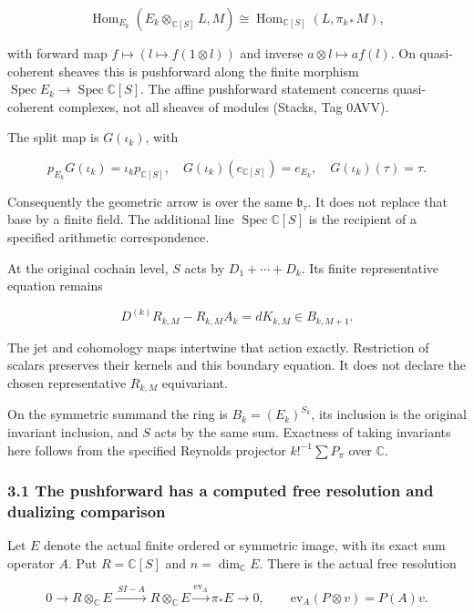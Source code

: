 \[\operatorname{Hom}_{E_k}(E_k\otimes_{\mathbb C[S]}L,M)
\cong\operatorname{Hom}_{\mathbb C[S]}(L,\pi_{k*}M),\tag{3.2}\]

with forward map \(f\mapsto(l\mapsto f(1\otimes l))\) and inverse
\(a\otimes l\mapsto a f(l)\). On quasi-coherent sheaves this is
pushforward along the finite morphism
\(\operatorname{Spec}E_k\to\operatorname{Spec}\mathbb C[S]\). The affine
pushforward statement concerns quasi-coherent complexes, not all sheaves
of modules (Stacks, Tag 0AVV).

The split map is \(G(\iota_k)\), with

\[p_{E_k}G(\iota_k)=\iota_kp_{\mathbb C[S]},\quad
G(\iota_k)(e_{\mathbb C[S]})=e_{E_k},\quad G(\iota_k)(\tau)=\tau.\tag{3.3}\]

Consequently the geometric arrow is over the same \(\mathfrak b_\tau\).
It does not replace that base by a finite field. The additional line
\(\operatorname{Spec}\mathbb C[S]\) is the recipient of a specified
arithmetic correspondence.

At the original cochain level, \(S\) acts by \(D_1+\cdots+D_k\). Its
finite representative equation remains

\[D^{(k)}R_{k,M}-R_{k,M}A_k=dK_{k,M}\in B_{k,M+1}.\tag{3.4}\]

The jet and cohomology maps intertwine that action exactly. Restriction
of scalars preserves their kernels and this boundary equation. It does
not declare the chosen representative \(R_{k,M}\) equivariant.

On the symmetric summand the ring is \(B_k=(E_k)^{S_k}\), its inclusion
is the original invariant inclusion, and \(S\) acts by the same sum.
Exactness of taking invariants here follows from the specified Reynolds
projector \(k!^{-1}\sum P_\pi\) over \(\mathbb C\).

\subsubsection{3.1 The pushforward has a computed free resolution and
dualizing
comparison}\label{spectral_sum_full:the-pushforward-has-a-computed-free-resolution-and-dualizing-comparison}

Let \(E\) denote the actual finite ordered or symmetric image, with its
exact sum operator \(A\). Put \(R=\mathbb C[S]\) and
\(n=\dim_\mathbb C E\). There is the actual free resolution

\[\boxed{0\longrightarrow R\otimes_\mathbb C E
\xrightarrow{\ S I-A\ }R\otimes_\mathbb C E
\xrightarrow{\mathrm{ev}_A}\pi_*E\longrightarrow0,\qquad
\mathrm{ev}_A(P\otimes v)=P(A)v.}\tag{3.5}\]

